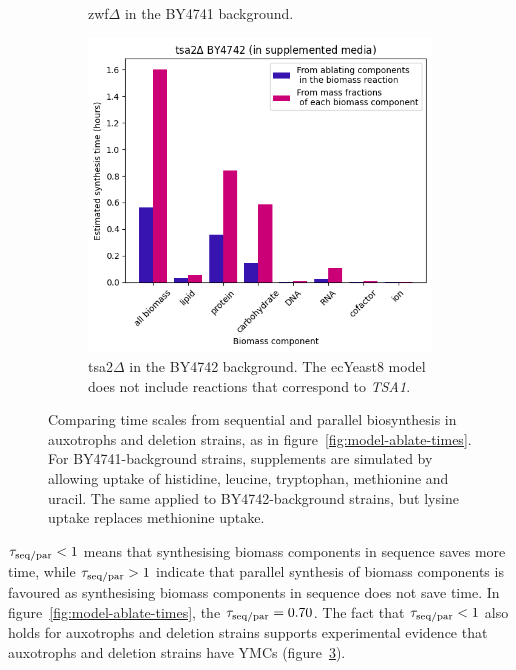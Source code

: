 \begin{figure}
\begin{subfigure}[htpb]{0.45\textwidth}
   \caption{
     zwf$\Delta$ in the BY4741 background.
   }
   \label{fig:model-ablation-zwf1}
  \end{subfigure}
  \begin{subfigure}[htpb]{0.45\textwidth}
   \centering
   \includegraphics[width=\textwidth]{ablation_tsa2}
   \caption{
     tsa2$\Delta$ in the BY4742 background.  The ecYeast8 model does not include reactions that correspond to \textit{TSA1}.
   }
   \label{fig:model-ablation-tsa2}
  \end{subfigure}
  \caption{
    Comparing time scales from sequential and parallel biosynthesis in auxotrophs and deletion strains, as in figure~\ref{fig:model-ablate-times}.
    For BY4741-background strains, supplements are simulated by allowing uptake of histidine, leucine, tryptophan, methionine and uracil.
    The same applied to BY4742-background strains, but lysine uptake replaces methionine uptake.
  }
  \label{fig:model-ablation-strains}
\end{figure}

$\tau_{\mathrm{seq}/\mathrm{par}} < 1$ means that synthesising biomass components in sequence saves more time, while $\tau_{\mathrm{seq}/\mathrm{par}} > 1$ indicate that parallel synthesis of biomass components is favoured as synthesising biomass components in sequence does not save time.
In figure~\ref{fig:model-ablate-times}, the $\tau_{\mathrm{seq}/\mathrm{par}} = 0.70$.
The fact that $\tau_{\mathrm{seq}/\mathrm{par}} < 1$ also holds for auxotrophs and deletion strains supports experimental evidence that auxotrophs and deletion strains have YMCs (figure~\ref{fig:model-ablation-strains}).

